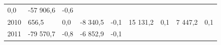 \begin{longtable}[]{@{}lllllllll@{}}
\begin{minipage}[t]{0.06\columnwidth}
0,0\strut
\end{minipage} & \begin{minipage}[t]{0.09\columnwidth}\raggedright
-57 906,6\strut
\end{minipage} & \begin{minipage}[t]{0.06\columnwidth}\raggedright
-0,6\strut
\end{minipage}\tabularnewline
\begin{minipage}[t]{0.05\columnwidth}\raggedright
2010\strut
\end{minipage} & \begin{minipage}[t]{0.10\columnwidth}\raggedright
656,5\strut
\end{minipage} & \begin{minipage}[t]{0.06\columnwidth}\raggedright
0,0\strut
\end{minipage} & \begin{minipage}[t]{0.16\columnwidth}\raggedright
-8 340,5\strut
\end{minipage} & \begin{minipage}[t]{0.06\columnwidth}\raggedright
-0,1\strut
\end{minipage} & \begin{minipage}[t]{0.12\columnwidth}\raggedright
15 131,2\strut
\end{minipage} & \begin{minipage}[t]{0.06\columnwidth}\raggedright
0,1\strut
\end{minipage} & \begin{minipage}[t]{0.09\columnwidth}\raggedright
7 447,2\strut
\end{minipage} & \begin{minipage}[t]{0.06\columnwidth}\raggedright
0,1\strut
\end{minipage}\tabularnewline
\begin{minipage}[t]{0.05\columnwidth}\raggedright
2011\strut
\end{minipage} & \begin{minipage}[t]{0.10\columnwidth}\raggedright
-79 570,7\strut
\end{minipage} & \begin{minipage}[t]{0.06\columnwidth}\raggedright
-0,8\strut
\end{minipage} & \begin{minipage}[t]{0.16\columnwidth}\raggedright
-6 852,9\strut
\end{minipage} & \begin{minipage}[t]{0.06\columnwidth}\raggedright
-0,1\strut
\end{minipage} & \begin{minipage}[t]{0.12\columnwidth}\raggedright

\end{minipage}
\end{longtable}
